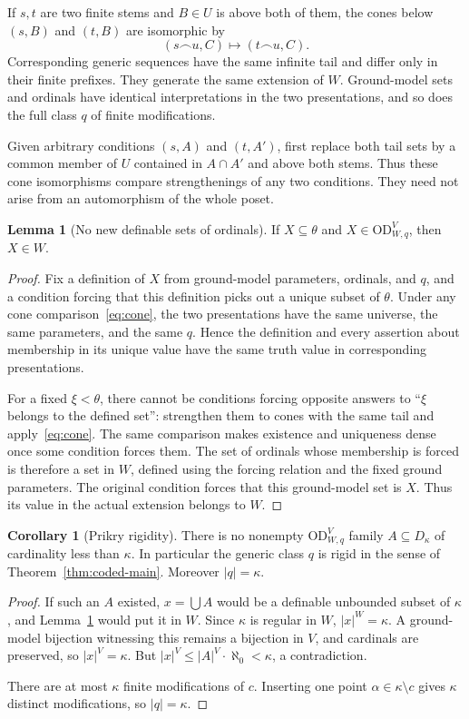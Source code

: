 \documentclass[11pt,letterpaper]{article}
\theoremstyle{definition}
\newtheorem{lemma}[definition]{Lemma}
\newtheorem{corollary}[definition]{Corollary}
\numberwithin{equation}{section}
\newcommand{\OD}{\mathrm{OD}}
\newcommand{\cat}{\mathbin{\smallfrown}}
\newcommand{\ODW}{\OD^{V}_{W,q}}
\begin{document}
If $s,t$ are two finite stems and $B\in U$ is above both of them, the cones below $(s,B)$ and $(t,B)$ are isomorphic by
\begin{equation}\label{eq:cone}
(s\cat u,C)\longmapsto(t\cat u,C).
\end{equation}
Corresponding generic sequences have the same infinite tail and differ only in their finite prefixes. They generate the same extension of $W$. Ground-model sets and ordinals have identical interpretations in the two presentations, and so does the full class $q$ of finite modifications.

Given arbitrary conditions $(s,A)$ and $(t,A')$, first replace both tail sets by a common member of $U$ contained in $A\cap A'$ and above both stems. Thus these cone isomorphisms compare strengthenings of any two conditions. They need not arise from an automorphism of the whole poset.

\begin{lemma}[No new definable sets of ordinals]\label{lem:od-ord}
If $X\subseteq\theta$ and $X\in\ODW$, then $X\in W$.
\end{lemma}
\begin{proof}
Fix a definition of $X$ from ground-model parameters, ordinals, and $q$, and a condition forcing that this definition picks out a unique subset of $\theta$. Under any cone comparison~\eqref{eq:cone}, the two presentations have the same universe, the same parameters, and the same $q$. Hence the definition and every assertion about membership in its unique value have the same truth value in corresponding presentations.

For a fixed $\xi<\theta$, there cannot be conditions forcing opposite answers to ``$\xi$ belongs to the defined set'': strengthen them to cones with the same tail and apply~\eqref{eq:cone}. The same comparison makes existence and uniqueness dense once some condition forces them. The set of ordinals whose membership is forced is therefore a set in $W$, defined using the forcing relation and the fixed ground parameters. The original condition forces that this ground-model set is $X$. Thus its value in the actual extension belongs to $W$.
\end{proof}

\begin{corollary}[Prikry rigidity]\label{cor:rigid}
There is no nonempty $\ODW$ family $A\subseteq D_\kappa$ of cardinality less than $\kappa$. In particular the generic class $q$ is rigid in the sense of Theorem~\ref{thm:coded-main}. Moreover $|q|=\kappa$.
\end{corollary}
\begin{proof}
If such an $A$ existed, $x=\bigcup A$ would be a definable unbounded subset of $\kappa$, and Lemma~\ref{lem:od-ord} would put it in $W$. Since $\kappa$ is regular in $W$, $|x|^W=\kappa$. A ground-model bijection witnessing this remains a bijection in $V$, and cardinals are preserved, so $|x|^V=\kappa$. But $|x|^V\leq |A|^V\cdot\aleph_0<\kappa$, a contradiction.

There are at most $\kappa$ finite modifications of $c$. Inserting one point $\alpha\in\kappa\setminus c$ gives $\kappa$ distinct modifications, so $|q|=\kappa$.
\end{proof}
\end{document}
